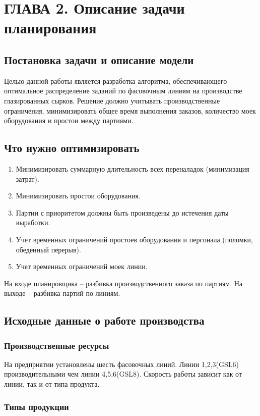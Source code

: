 \chapter{ ГЛАВА 2. Описание задачи планирования}
\label{ch:chapter2}

\section{Постановка задачи и описание модели}
Целью данной работы является разработка алгоритма, обеспечивающего оптимальное распределение заданий по фасовочным линиям на производстве глазированных сырков. Решение должно учитывать производственные ограничения, минимизировать общее время выполнения заказов, количество моек оборудования и простои между партиями.

\section{Что нужно оптимизировать}

\begin{enumerate}
	\item Минимизировать суммарную длительность всех переналадок (минимизация затрат).
	\item Минимизировать простои оборудования.
	\item Партии с приоритетом должны быть произведены до истечения даты выработки.
	\item Учет временных ограничений простоев оборудования и персонала (поломки, обеденный перерыв).
	\item Учет временных ограничений моек линии.
\end{enumerate}

На входе планировщика – разбивка производственного заказа по партиям. На выходе – разбивка партий по линиям.

\section{Исходные данные о работе производства}

\subsection{Производственные ресурсы}
На предприятии установлены шесть фасовочных линий.  Линии 1,2,3(GSL6) производительными чем линии 4,5,6(GSL8). Скорость работы зависит как от линии, так и от типа продукта.

\subsection{Типы продукции}

